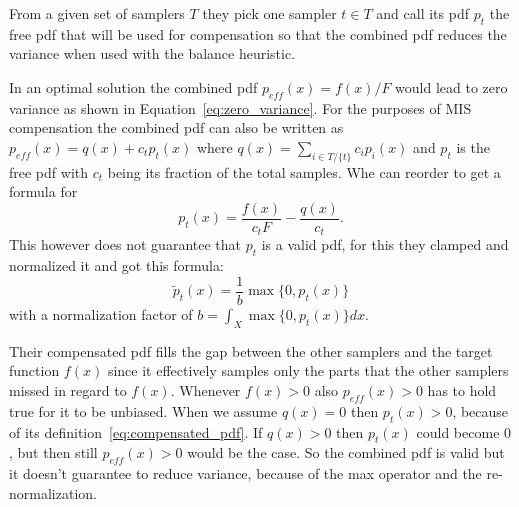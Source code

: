 From a given set of samplers $ T $ they pick one sampler $ t \in T $ and call its pdf $ p_t $ the free pdf that will be used for compensation
so that the combined pdf reduces the variance when used with the balance heuristic.

In an optimal solution the combined pdf $ p_{eff}(x) = f(x)/F $ would lead to zero variance as shown in Equation~\ref{eq:zero_variance}.
For the purposes of MIS compensation the combined pdf can also be written as $ p_{eff}(x) = q(x) + c_t p_t(x) $ where $ q(x) = \sum_{i \in T/\{t\}} c_i p_i(x) $
and $ p_t $ is the free pdf with $ c_t $ being its fraction of the total samples.
Whe can reorder to get a formula for
\begin{equation}
    \label{eq:compensated_pdf}
    p_t(x) = \frac{f(x)}{c_t F} - \frac{q(x)}{c_t}.
\end{equation}
This however does not guarantee that $ p_t $ is a valid pdf,
for this they clamped and normalized it and got this formula:
\begin{equation}
    \label{eq:valid_compensated_pdf}
    \tilde{p}_t(x) = \frac{1}{b} \max\{0, p_t(x)\}
\end{equation}
with a normalization factor of $ b = \int_X \max\{0, p_t(x)\} dx $.

Their compensated pdf fills the gap between the other samplers and the target function $ f(x) $
since it effectively samples only the parts that the other samplers missed in regard to $ f(x) $.
Whenever $ f(x) > 0 $ also $ p_{eff}(x) > 0 $ has to hold true for it to be unbiased.
When we assume $ q(x) = 0 $ then $ p_t(x) > 0 $, because of its definition~\ref{eq:compensated_pdf}.
If $ q(x) > 0 $ then $ p_t(x) $ could become $ 0 $, but then still $ p_{eff}(x) > 0 $ would be the case.
So the combined pdf is valid but it doesn't guarantee to reduce variance, because of the max operator and the re-normalization.



